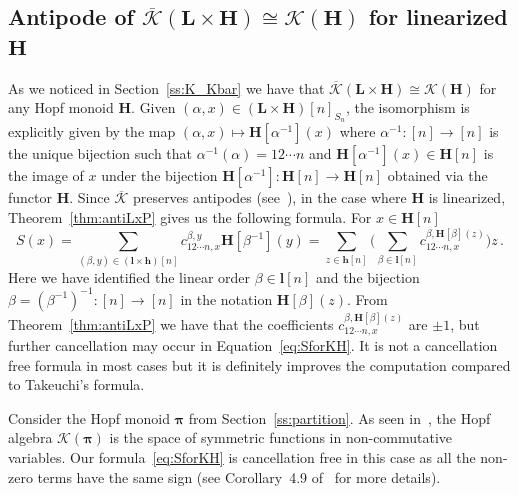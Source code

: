 \documentclass[ALCO,ThmDefs,Unicode,epreuves]{cedram}
\newcommand{\bL}{\mathbf{L}}
\newcommand{\bH}{\mathbf{H}}
\newcommand{\bh}{\mathbf{h}}
\newcommand{\bPi}{\bpi}
\newcommand{\bpi}{\boldsymbol \pi}
\newcommand{\Kc}{\mathcal{K}}
\newcommand{\Kcb}{\overline{\Kc}}
\begin{document}
\subsection{Antipode of \texorpdfstring{$ \Kcb(\bL\times\bH) \cong \Kc(\bH)$}{ overline K(L times H) 
approximately equal K(H)} for linearized \texorpdfstring{$\bH$}{H}}\label{s:KLxH} 
As we noticed in Section~\ref{ss:K_Kbar} we have that $\Kcb(\bL\times\bH) \cong \Kc(\bH)$ for
any Hopf monoid $\bH$. Given $(\alpha,x)\in (\bL\times\bH)[n]_{S_n}$, the isomorphism is explicitly given by the map $(\alpha,x)\mapsto \bH[\alpha^{-1}](x)$ where $\alpha^{-1}\colon[n]\to[n]$
is the unique bijection such that $\alpha^{-1}(\alpha)=12\cdots n$ and $\bH[\alpha^{-1}](x)\in \bH[n]$ is the image of $x$ under the bijection $\bH[\alpha^{-1}]\colon \bH[n]\to\bH[n]$ obtained via the functor $\bH$.
Since $\Kcb$ preserves antipodes (see~\cite[Section~15.2]{AM:2010}), in the case where $\bH$ is linearized, Theorem~\ref{thm:antiLxP} gives us the following formula. For $x\in \bH[n]$
 \begin{equation}\label{eq:SforKH}
 S(x)= \sum_{(\beta,y)\in (\mathbf{l}\times\bh)[n]} c_{12\cdots n,x}^{\beta,y} \bH[\beta^{-1}](y) = \sum_{z\in\bh[n]}\Big( \sum_{\beta\in \mathbf{l}[n]} c_{12\cdots n,x}^{\beta, \bH[\beta](z)} \Big) z\,.
 \end{equation}
Here we have identified the linear order $\beta\in\mathbf{l}[n]$ and the bijection $\beta=(\beta^{-1})^{-1}\colon[n]\to[n]$ in the notation $\bH[\beta](z)$. From Theorem~\ref{thm:antiLxP}
we have that the coefficients $c_{12\cdots n,x}^{\beta, \bH[\beta](z)}$ are $\pm 1$, but further cancellation may occur in Equation~\eqref{eq:SforKH}. It is not a cancellation free formula in most cases but it is definitely improves the computation compared to Takeuchi's formula.

\begin{exam} \label{ex:super}
Consider the Hopf monoid $\bPi$ from Section~\ref{ss:partition}. As seen in~\cite{BakerJarvisBergeronThiem}, the Hopf algebra $\Kc(\bPi)$ is the space of symmetric functions
in non-commutative variables. Our formula~\eqref{eq:SforKH} is cancellation free in this case as all the non-zero terms have the same sign (see Corollary~4.9 of~\cite{BakerJarvisBergeronThiem} for more details).
\end{exam}
\end{document}
